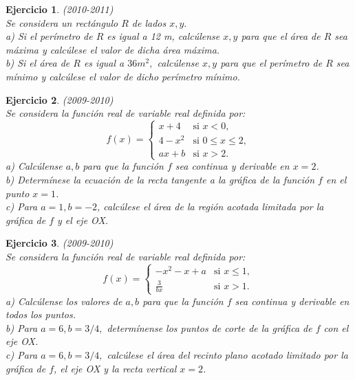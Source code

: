 \documentclass[12pt, a4paper]{amsart}
\newtheorem{ejer}{Ejercicio}
\begin{document}
\begin{ejer}\em (2010-2011)\\
Se considera un rectángulo $R$ de lados $x,y.$\\
a) Si el perímetro de $R$ es igual a 12 m, calcúlense $x,y$ para que el área de $R$ sea máxima y calcúlese el valor de dicha área máxima.\\
b) Si el área de $R$ es igual a $36 m^2,$ calcúlense $x,y$ para que el perímetro de $R$ sea mínimo y calcúlese el valor de dicho perímetro mínimo.
\end{ejer}


\begin{ejer}\em (2009-2010)\\
Se considera la función real de variable real definida por:
\begin{equation*}
f(x)=\left \{ \begin{matrix} x+4 & \mbox{si } x<0,
\\ 4-x^2 & \mbox{si } 0\leq x\leq 2,
\\ ax+b & \mbox{si } x>2. \end{matrix}\right. 
\end{equation*}
a) Calcúlense $a,b$ para que la función $f$ sea continua y derivable en $x=2$.\\
b) Determínese la ecuación de la recta tangente a la gráfica de la función $f$ en el punto $x=1$.\\
c) Para $a=1,b=-2$, calcúlese el área de la región acotada limitada por la gráfica de $f$ y el eje OX.
\end{ejer}

\begin{ejer}\em (2009-2010)\\%
Se considera la función real de variable real definida por:
\begin{equation*}
f(x)=\left \{ \begin{matrix} -x^2-x+a & \mbox{si } x\leq 1,
\\ \frac{3}{bx} & \mbox{si } x>1. \end{matrix}\right. 
\end{equation*}
a) Calcúlense los valores de $a,b$ para que la función $f$ sea continua y derivable en todos los puntos.\\
b) Para $a=6,b=3/4,$ determínense los puntos de corte de la gráfica de $f$ con el eje OX.\\
c) Para $a=6,b=3/4,$ calcúlese el área del recinto plano acotado limitado por la gráfica de $f$, el eje OX y la recta vertical $x=2$.
\end{ejer}
\end{document}
